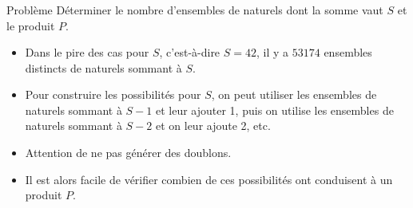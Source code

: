 \begin{frame}
    \frametitle{\problemtitle}
    \begin{block}{Problème}
        Déterminer le nombre d'ensembles de naturels dont la somme vaut $S$ et le produit $P$.
    \end{block}
    \pause
    \begin{itemize}[<+->]
        \item Dans le pire des cas pour $S$, c'est-à-dire $S=42$, il y a $53174$ ensembles distincts de naturels sommant à $S$.
        \item<+-> Pour construire les possibilités pour $S$, on peut utiliser les ensembles de naturels sommant à $S-1$ et leur ajouter 1, puis on utilise les ensembles de naturels sommant à $S-2$ et on leur ajoute 2, etc.
        \item Attention de ne pas générer des doublons.
        \item Il est alors facile de vérifier combien de ces possibilités ont conduisent à un produit $P$.
    \end{itemize}

\end{frame}